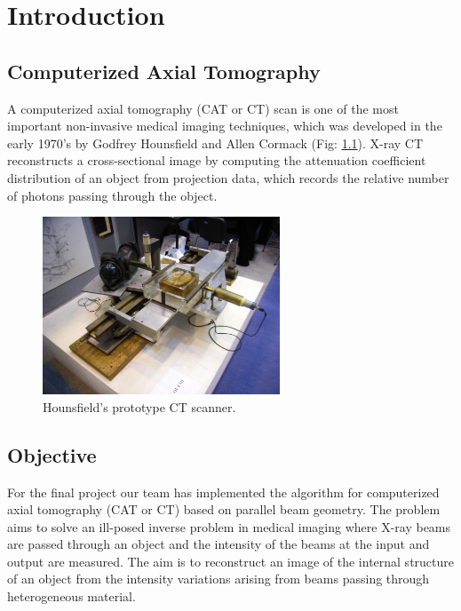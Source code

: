 
\chapter{Introduction} %

\label{Chapter1} %



\section{Computerized Axial Tomography}
A computerized axial tomography (CAT or CT) scan is one of the most important non-invasive medical imaging techniques, which was developed in the early 1970's by Godfrey Hounsfield and Allen Cormack (Fig: \ref{fig:prototype})\cite{Doe:2009:Online}. X-ray CT reconstructs a cross-sectional image by computing the attenuation coefficient distribution of an object from projection data, which records the relative number of photons passing through the object.

\begin{figure}[htbp]
	\centering
		\includegraphics[width=200pt]{Figures/ct1.JPG}
	\caption[Hounsfield's prototype CT scanner]{Hounsfield's prototype CT scanner.}
	\label{fig:prototype}
\end{figure}

\section{Objective}
For the final project our team has implemented the algorithm for computerized axial tomography (CAT or CT) based on parallel beam geometry. The problem aims to solve an ill-posed inverse problem in medical imaging where X-ray beams are passed through an object and the intensity of the beams at the input and output are measured. The aim is to reconstruct an image of the internal structure of an object from the intensity variations arising from beams passing through
heterogeneous material.

